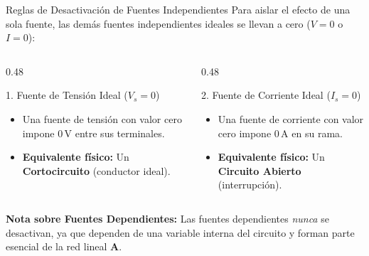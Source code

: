 \documentclass[aspectratio=169, table, xcdraw]{beamer}
\begin{document}
\begin{frame}{Reglas de Desactivación de Fuentes Independientes}
    Para aislar el efecto de una sola fuente, las demás fuentes independientes ideales se llevan a cero ($V=0$ o $I=0$):
    
    \begin{columns}
        \begin{column}{0.48\textwidth}
            \begin{block}{1. Fuente de Tensión Ideal ($V_s = 0$)}
                \begin{itemize}
                    \item Una fuente de tensión con valor cero impone $0\,\text{V}$ entre sus terminales.
                    \item \textbf{Equivalente físico:} Un \textbf{Cortocircuito} (conductor ideal).
                \end{itemize}
            \end{block}
        \end{column}
        \begin{column}{0.48\textwidth}
            \begin{block}{2. Fuente de Corriente Ideal ($I_s = 0$)}
                \begin{itemize}
                    \item Una fuente de corriente con valor cero impone $0\,\text{A}$ en su rama.
                    \item \textbf{Equivalente físico:} Un \textbf{Circuito Abierto} (interrupción).
                \end{itemize}
            \end{block}
        \end{column}
    \end{columns}
    
    \vspace{0.3cm}
    \textbf{Nota sobre Fuentes Dependientes:} Las fuentes dependientes \textit{nunca} se desactivan, ya que dependen de una variable interna del circuito y forman parte esencial de la red lineal $\bm{A}$.
\end{frame}
\end{document}
